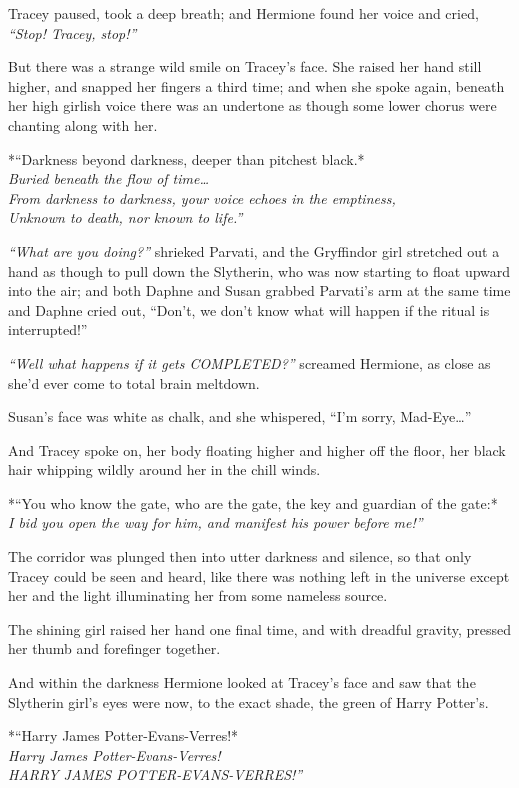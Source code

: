 Tracey paused, took a deep breath; and Hermione found her voice and
cried, \emph{``Stop! Tracey, stop!''}

But there was a strange wild smile on Tracey's face. She raised her hand
still higher, and snapped her fingers a third time; and when she spoke
again, beneath her high girlish voice there was an undertone as though
some lower chorus were chanting along with her.

*``Darkness beyond darkness, deeper than pitchest black.*\\\emph{Buried
beneath the flow of time\ldots{}}\\\emph{From darkness to darkness, your
voice echoes in the emptiness,}\\\emph{Unknown to death, nor known to
life.''}

\emph{``What are you doing?''} shrieked Parvati, and the Gryffindor girl
stretched out a hand as though to pull down the Slytherin, who was now
starting to float upward into the air; and both Daphne and Susan grabbed
Parvati's arm at the same time and Daphne cried out, ``Don't, we don't
know what will happen if the ritual is interrupted!''

\emph{``Well what happens if it gets COMPLETED?''} screamed Hermione, as
close as she'd ever come to total brain meltdown.

Susan's face was white as chalk, and she whispered, ``I'm sorry,
Mad-Eye\ldots{}''

And Tracey spoke on, her body floating higher and higher off the floor,
her black hair whipping wildly around her in the chill winds.

*``You who know the gate, who are the gate, the key and guardian of the
gate:*\\\emph{I bid you open the way for him, and manifest his power
before me!''}

The corridor was plunged then into utter darkness and silence, so that
only Tracey could be seen and heard, like there was nothing left in the
universe except her and the light illuminating her from some nameless
source.

The shining girl raised her hand one final time, and with dreadful
gravity, pressed her thumb and forefinger together.

And within the darkness Hermione looked at Tracey's face and saw that
the Slytherin girl's eyes were now, to the exact shade, the green of
Harry Potter's.

*``Harry James Potter-Evans-Verres!*\\\emph{Harry James
Potter-Evans-Verres!}\\\emph{HARRY JAMES POTTER-EVANS-VERRES!''}

